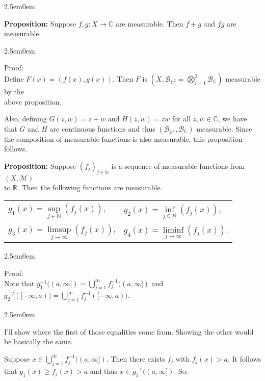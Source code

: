 \documentclass{book}
\newcommand{\hTwo}{%
\color{MidnightBlue}%
   \fontsize{13}{15}\selectfont%
}
\newcommand{\hThree}{%
   \color{PineGreen!85!Orange}
   \fontsize{12}{14}\selectfont%
}
\newcommand{\hFour}{%
   \color{Cyan!80!black}
   \fontsize{12}{14}\selectfont%
}
\newenvironment{myIndent}{%
   \begin{adjustwidth}{2.5em}{0em}%
}{%
   \end{adjustwidth}%
}
\newcommand{\blab}[1]{\textbf{#1}}
\newcommand{\retTwo}{\hfill\bigbreak}
\begin{document}
\begin{myIndent}\hTwo
   \blab{Proposition:} Suppose $f, g: X \longrightarrow \mathbb{C}$ are measurable. Then $f + g$ and $fg$ are measurable.

   \begin{myIndent}\hThree
      Proof:\\ [-6pt]
      Define $F(x) = (f(x), g(x))$. Then $F$ is $(X, \mathcal{B}_{\mathbb{C}^2} = \bigotimes\limits_{i=1}^2 \mathcal{B}_{\mathbb{C}})$ measurable by the\\ [-6pt] above proposition.\retTwo

      Also, defining $G(z, w) = z + w$ and $H(z, w) = zw$ for all $z, w \in \mathbb{C}$, we have that $G$ and $H$ are continuous functions and thus $(\mathcal{B}_{\mathbb{C}^2}, \mathcal{B}_{\mathbb{C}})$ measurable. Since the composition of measurable functions is also measurable, this proposition follows.\retTwo
   \end{myIndent}

   \blab{Proposition:} Suppose $(f_j)_{j \in \mathbb{N}}$ is a sequence of measurable functions from $(X, \mathcal{M})$\\ to $\overline{\mathbb{R}}$. Then the following functions are measurable.
   
   {\centering 
   \begin{tabular}{l l}
      $g_1(x) = \sup\limits_{j \in \mathbb{N}}(f_j(x))$,& $g_2(x) = \inf\limits_{j \in \mathbb{N}}(f_j(x))$,\\ [12pt] $g_3(x) = \limsup\limits_{j \rightarrow \infty} (f_j(x))$,& $g_4(x) = \liminf\limits_{j \rightarrow \infty} (f_j(x))$.
   \end{tabular}\retTwo\par}

   \begin{myIndent}\hThree
      Proof:\\ [-3pt]
      Note that $g_1^{-1}((a, \infty]) = \bigcup\limits_{j=1}^\infty f_j^{-1}((a, \infty])$ and $g_2^{-2}([-\infty, a)) = \bigcup\limits_{j=1}^\infty f_j^{-1}([-\infty, a))$.
      
      \begin{myIndent}\hFour
         I'll show where the first of those equalities come from. Showing the other would be basically the same.\newpage

         Suppose $x \in \bigcup\limits_{j=1}^\infty f_j^{-1}((a, \infty])$. Then there exists $f_j$ with $f_j(x) > a$. It follows\\ [-8pt]\phantom{aaaaaaaaaaaaaaaa} that $g_1(x) \geq f_j(x) > a$ and thus $x \in g_1^{-1}((a, \infty])$. So:
         

\end{myIndent}
\end{myIndent}
\end{myIndent}
\end{document}
